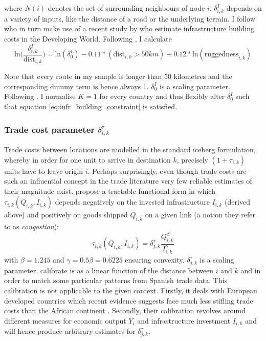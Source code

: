 \documentclass[11pt, oneside]{article}   	%
\begin{document}
where $N(i)$ denotes the set of surrounding neighbours of node $i$. $\delta_{i,k}^{I}$ depends on a variety of inputs, like the distance of a road or the underlying terrain. I follow \citeauthor{fajgelbaum_optimal_2017} who in turn make use of a recent study by \cite{collier_cost_2015} who estimate infrastructure building costs in the Developing World. Following \citeauthor{fajgelbaum_optimal_2017}, I calculate
\begin{equation}
  \textrm{ln}\Big(\frac{\delta^{I}_{i,k}}{\textrm{dist}_{i,k}}\Big) = \textrm{ln}(\delta_{0}^{I}) - 0.11*(\textrm{dist}_{i,k} > 50km) + 0.12*\textrm{ln}(\textrm{ruggedness}_{i,k})
\end{equation}

Note that every route in my sample is longer than 50 kilometres and the corresponding dummy term is hence always 1. $\delta_{0}^{I}$ is a scaling parameter. Following \citeauthor{fajgelbaum_optimal_2017}, I normalise $K=1$ for every country and thus flexibly alter $\delta_{0}^{I}$ such that equation \eqref{eq:infr_building_constraint} is satisfied.

\subsubsection{Trade cost parameter $\delta_{i,k}^{\tau}$}
Trade costs between locations are modelled in the standard iceberg formulation, whereby in order for one unit to arrive in destination $k$, precisely $(1+\tau_{i,k})$ units have to leave origin $i$. Perhaps surprisingly, even though trade costs are such an influential concept in the trade literature very few reliable estimates of their magnitude exist. \citeauthor{fajgelbaum_optimal_2017} propose a tractable functional form in which $\tau_{i,k}(Q_{i,k}, I_{i,k})$ depends negatively on the invested infrastructure $I_{i,k}$ (derived above) and positively on goods shipped $Q_{i,k}$ on a given link (a notion they refer to as \emph{congestion}):
\begin{equation}
  \tau_{i,k}(Q_{i,k}, I_{i,k}) = \delta^{\tau}_{j, k} \frac{Q_{i,k}^{\beta}}{I_{i,k}^{\gamma}}
\end{equation}
with $\beta = 1.245$ and $\gamma = 0.5\beta = 0.6225$ ensuring convexity. $\delta^{\tau}_{j, k}$ is a scaling parameter. \citeauthor{fajgelbaum_optimal_2017} calibrate is as a linear function of the distance between $i$ and $k$ and in order to match some particular patterns from Spanish trade data. This calibration is not applicable to the given context. Firstly, it deals with European developed countries which recent evidence suggests face much less stifling trade costs than the African continent \citep[see e.g.][]{Anderson_Tradecosts_2004}. Secondly, their calibration revolves around different measures for economic output $Y_{i}$ and infrastructure investment $I_{i,k}$ and will hence produce arbitrary estimates for $\delta^{\tau}_{j, k}$.
\end{document}
